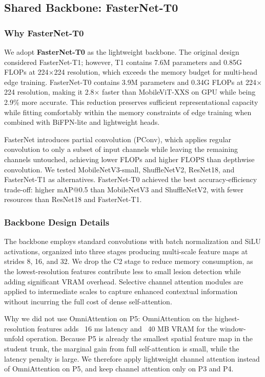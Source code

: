 \documentclass[10pt,a4paper,twocolumn]{article}
\begin{document}
\subsection{Shared Backbone: FasterNet-T0}

\subsubsection{Why FasterNet-T0}

We adopt \textbf{FasterNet-T0} as the lightweight backbone. The original design considered FasterNet-T1; however, T1 contains 7.6M parameters and 0.85G FLOPs at 224$\times$224 resolution, which exceeds the memory budget for multi-head edge training. FasterNet-T0 contains 3.9M parameters and 0.34G FLOPs at 224$\times$224 resolution, making it 2.8$\times$ faster than MobileViT-XXS on GPU while being 2.9\% more accurate. This reduction preserves sufficient representational capacity while fitting comfortably within the memory constraints of edge training when combined with BiFPN-lite and lightweight heads.

FasterNet introduces partial convolution (PConv), which applies regular convolution to only a subset of input channels while leaving the remaining channels untouched, achieving lower FLOPs and higher FLOPS than depthwise convolution. We tested MobileNetV3-small, ShuffleNetV2, ResNet18, and FasterNet-T1 as alternatives. FasterNet-T0 achieved the best accuracy-efficiency trade-off: higher mAP@0.5 than MobileNetV3 and ShuffleNetV2, with fewer resources than ResNet18 and FasterNet-T1.

\subsubsection{Backbone Design Details}

The backbone employs standard convolutions with batch normalization and SiLU activations, organized into three stages producing multi-scale feature maps at strides 8, 16, and 32. We drop the C2 stage to reduce memory consumption, as the lowest-resolution features contribute less to small lesion detection while adding significant VRAM overhead. Selective channel attention modules are applied to intermediate scales to capture enhanced contextual information without incurring the full cost of dense self-attention.

Why we did not use OmniAttention on P5: OmniAttention on the highest-resolution features adds ~16 ms latency and ~40 MB VRAM for the window-unfold operation. Because P5 is already the smallest spatial feature map in the student trunk, the marginal gain from full self-attention is small, while the latency penalty is large. We therefore apply lightweight channel attention instead of OmniAttention on P5, and keep channel attention only on P3 and P4.
\end{document}
